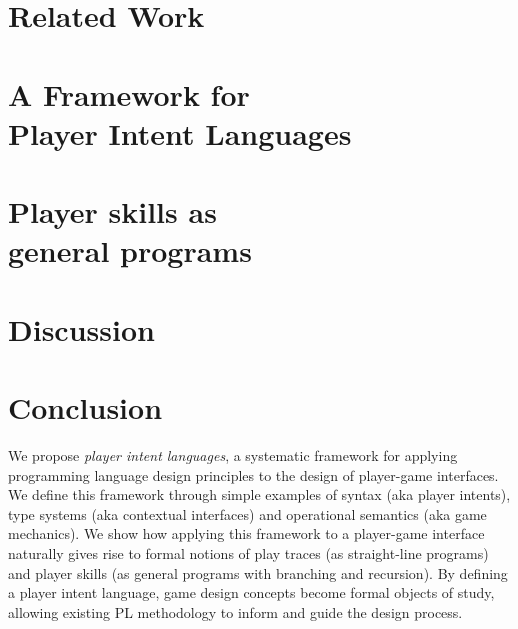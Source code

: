 \documentclass[sigconf]{acmart}
\begin{document}

\section{Related Work}



\section{A Framework for \\ Player Intent Languages}


  
% 

\section{Player skills as \\ general programs}
\label{sec:skills}



\section{Discussion}
\label{sec:discussion}


\section{Conclusion}
\label{sec:conclusion}

We propose \emph{player intent languages}, a systematic framework for
applying programming language design principles to the design of
player-game interfaces.
%
We define this framework through simple examples of syntax (aka player
intents), type systems (aka contextual interfaces) and operational
semantics (aka game mechanics).
%
We show how applying this framework to a player-game interface
naturally gives rise to formal notions of play traces (as
straight-line programs) and player skills (as general programs with
branching and recursion).
%
By defining a player intent language, game design concepts become
formal objects of study, allowing existing PL methodology to inform and
guide the design process.
\end{document}
